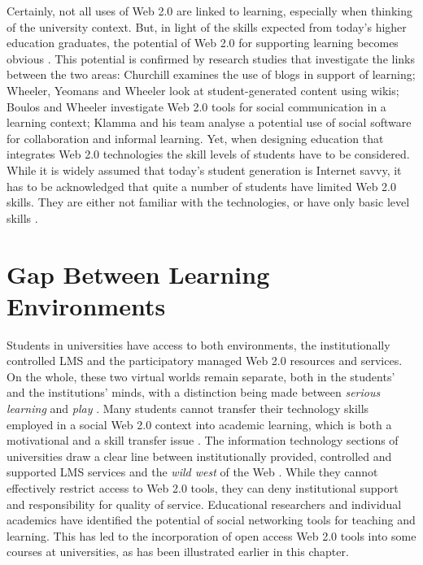 Certainly, not all uses of Web 2.0 are linked to learning, especially when
thinking of the university context. But, in light of the \LLLs skills expected
from today's higher education graduates, the potential of Web 2.0 for supporting
learning becomes obvious \citep{Tian2011}. This potential is confirmed by
research studies that investigate the links between the two areas: Churchill
\citeyearpar{Churchill2009} examines the use of blogs in support of learning;
Wheeler, Yeomans and Wheeler \citeyearpar{Wheeler2008} look at student-generated
content using wikis; Boulos and Wheeler \citeyearpar{Boulos2007} investigate Web
2.0 tools for social communication in a learning context; Klamma and his team
\citeyearpar{Klamma2007} analyse a potential use of social software for
collaboration and informal learning. Yet, when designing education that
integrates Web 2.0 technologies the skill levels of students have to be
considered. While it is widely assumed that today's student generation is
Internet savvy, it has to be acknowledged that quite a number of students have
limited Web 2.0 skills. They are either not familiar with the technologies, or
have only basic level skills \citep{Kennedy2008,Hosein2010,Jones2010}.

\section{Gap Between Learning Environments}
Students in universities have access to both environments, the institutionally
controlled LMS and the participatory managed Web 2.0 resources and services. On
the whole, these two virtual worlds remain separate, both in the students' and
the institutions' minds, with a distinction being made between \textit{serious
learning} and \textit{play} \citep{Freire2008}. Many students cannot transfer
their technology skills employed in a social Web 2.0 context into academic
learning, which is both a motivational and a skill transfer issue
\citep{Katz2005}. The information technology sections of universities draw a
clear line between institutionally provided, controlled and supported LMS
services and the \textit{wild west} of the Web \citep{Havenstein2007a}. While
they cannot effectively restrict access to Web 2.0 tools, they can deny
institutional support and responsibility for quality of service. Educational
researchers and individual academics have identified the potential of social
networking tools for teaching and learning. This has led to the incorporation of
open access Web 2.0 tools into some courses at universities, as has been
illustrated earlier in this chapter.

